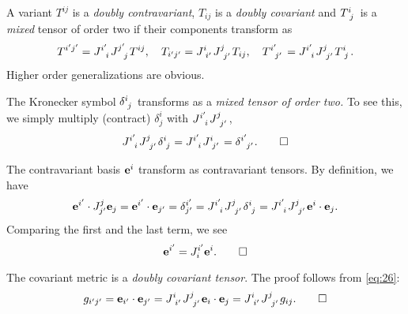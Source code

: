 \documentclass{article}
\begin{document}
	\begin{definition}
		A variant $ T^{ij} $ is a \textit{doubly contravariant}, $ T_{ij} $ is a \textit{doubly covariant} and $ T\indices{^{i}_{j}} $ is a \textit{mixed} tensor of order two if their components transform as
		\begin{equation}
		T^{i^\prime j^\prime} = J\indices{^{i^\prime}_{i}} J\indices{^{j^\prime}_{j}} T^{ij}, \quad T_{i^\prime j^\prime} = J\indices{^{i}_{i^\prime}} J\indices{^{j}_{j^\prime}} T_{ij}, \quad T\indices{^{i^\prime}_{j^\prime}} = J\indices{^{i^\prime}_{i}} J\indices{^{j}_{j^\prime}} T\indices{^{i}_{j}}.
		\end{equation}
		Higher order generalizations are obvious.
	\end{definition}
	 The Kronecker symbol $ \delta\indices{^{i}_{j}} $ transforms as a \textit{mixed tensor of order two.} To see this, we simply multiply (contract) $ \delta^{i}_{j} $ with $ J\indices{^{i^\prime}_{i}} J\indices{^{j}_{j^\prime}} $,
	\begin{equation}
	J\indices{^{i^\prime}_{i}} J\indices{^{j}_{j^\prime}} \delta\indices{^{i}_{j}} = J\indices{^{i^\prime}_{i}} J\indices{^{i}_{j^\prime}} = \delta\indices{^{i^\prime}_{j^\prime}}. \qed
	\end{equation}
	\begin{proposition}
		The contravariant basis $ \vb{e}^{i} $ transform as contravariant tensors. By definition, we have
		\[
		\vb{e}^{i^\prime} \cdot J^{j}_{j^\prime} \vb{e}_{j} = \vb{e}^{i^\prime} \cdot \vb{e}_{j^\prime} = \delta^{i^\prime}_{j^\prime} = J\indices{^{i^\prime}_{i}} J\indices{^{j}_{j^\prime}} \delta\indices{^{i}_{j}} = J\indices{^{i^\prime}_{i}} J\indices{^{j}_{j^\prime}} \vb{e}^{i} \cdot \vb{e}_{j}.
		\]
		Comparing the first and the last term, we see
		\begin{equation} \label{eq:210}
		\vb{e}^{i^\prime} = J^{i^\prime}_{i} \vb{e}^{i}. \qed
		\end{equation}
	\end{proposition}
	\begin{proposition}
		The covariant metric is a \textit{doubly covariant tensor}. The proof follows from \eqref{eq:26}:
		\begin{equation}
			g_{i^\prime j^\prime} = \vb{e}_{i^\prime} \cdot \vb{e}_{j^\prime} = J\indices{^{i}_{i^\prime}} J\indices{^{j}_{j^\prime}} \vb{e}_{i} \cdot \vb{e}_{j} = J\indices{^{i}_{i^\prime}} J\indices{^{j}_{j^\prime}} g_{ij}. \qed
		\end{equation}
	\end{proposition}
\end{document}
